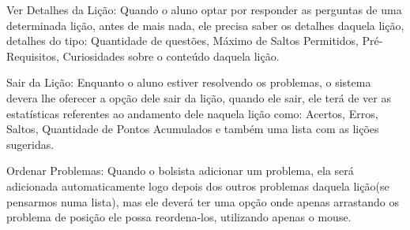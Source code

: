 \begin{alineascomponto}
	\item Ver Detalhes da Lição: Quando o aluno optar por responder as perguntas 
de uma determinada lição, antes de mais nada, ele precisa saber os detalhes 
daquela lição, detalhes do tipo: Quantidade de questões, Máximo de Saltos 
Permitidos, Pré-Requisitos, Curiosidades sobre o conteúdo daquela lição.

	\item Sair da Lição: Enquanto o aluno estiver resolvendo os problemas, o 
sistema devera lhe oferecer a opção dele sair da lição, quando ele sair, ele 
terá de ver as estatísticas referentes ao andamento dele naquela lição como: 
Acertos, Erros, Saltos, Quantidade de Pontos Acumulados e também uma lista com 
as lições sugeridas.
	
	\item Ordenar Problemas: Quando o bolsista adicionar um problema, ela será 
adicionada automaticamente logo depois dos outros problemas daquela lição(se 
pensarmos numa lista), mas ele deverá ter uma opção onde apenas arrastando 
os problema de posição ele possa reordena-los, utilizando apenas o mouse.

\end{alineascomponto}

